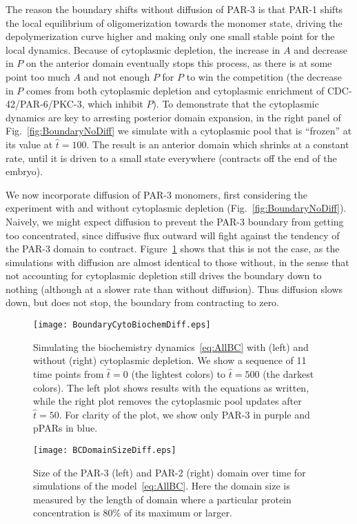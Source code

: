 \documentclass[11pt]{article}
\newcommand{\6}[1]{#1_{\text{6}}}
\newcommand{\3}[1]{#1_{\text{3}}}
\begin{document}
The reason the boundary shifts without diffusion of PAR-3 is that PAR-1 shifts the local equilibrium of oligomerization towards the monomer state, driving the depolymerization curve higher and making only one small stable point for the local dynamics. Because of cytoplasmic depletion, the increase in $A$ and decrease in $P$ on the anterior domain eventually stops this process, as there is at some point too much $A$ and not enough $P$ for $P$ to win the competition (the decrease in $P$ comes from both cytoplasmic depletion and cytoplasmic enrichment of CDC-42/PAR-6/PKC-3, which inhibit $P$). To demonstrate that the cytoplasmic dynamics are key to arresting posterior domain expansion, in the right panel of Fig.\ \ref{fig:BoundaryNoDiff} we simulate with a cytoplasmic pool that is ``frozen'' at its value at $\hat t = 100$. The result is an anterior domain which shrinks at a constant rate, until it is driven to a small state everywhere (contracts off the end of the embryo). 





We now incorporate diffusion of PAR-3 monomers, first considering the experiment with and without cytoplasmic depletion (Fig.\ \ref{fig:BoundaryNoDiff}). Naively, we might expect diffusion to prevent the PAR-3 boundary from getting too concentrated, since diffusive flux outward will fight against the tendency of the PAR-3 domain to contract. Figure\ \ref{fig:BoundaryDiff} shows that this is not the case, as the simulations with diffusion are almost identical to those without, in the sense that not accounting for cytoplasmic depletion still drives the boundary down to nothing (although at a slower rate than without diffusion). Thus diffusion slows down, but does not stop, the boundary from contracting to zero. 

\begin{figure}
\centering
\texttt{[image: BoundaryCytoBiochemDiff.eps]}
\caption{\label{fig:BoundaryDiff}Simulating the biochemistry dynamics\ \eqref{eq:AllBC} with (left) and without (right) cytoplasmic depletion. We show a sequence of 11 time points from $\hat t = 0$ (the lightest colors) to $\hat t = 500$ (the darkest colors). The left plot shows results with the equations as written, while the right plot removes the cytoplasmic pool updates after $\hat t = 50$. For clarity of the plot, we show only PAR-3 in purple and pPARs in blue. }
\end{figure}

\begin{figure}
\centering
\texttt{[image: BCDomainSizeDiff.eps]}
\caption{\label{fig:BCDSD} Size of the PAR-3 (left) and PAR-2 (right) domain over time for simulations of the model\ \eqref{eq:AllBC}. Here the domain size is measured by the length of domain where a particular protein concentration is 80\% of its maximum or larger. }
\end{figure}
\end{document}
